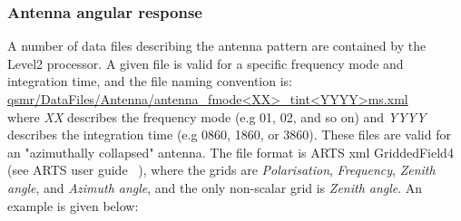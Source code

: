 \subsubsection*{Antenna angular response}

A number of data files describing the antenna pattern
are contained by the Level2 processor.
A given file is valid for a specific frequency mode and integration
time, and the file naming convention is:\\
\url{qsmr/DataFiles/Antenna/antenna_fmode<XX>_tint<YYYY>ms.xml}\\
where \emph{XX} describes the frequency mode (e.g 01, 02, and so on)
and \emph{YYYY} describes the integration time (e.g 0860, 1860, or 3860).
These files are valid for an "azimuthally collapsed"
antenna. The file format is ARTS xml GriddedField4 (see ARTS user guide ~\citep{artsug}),
where the grids are \emph{Polarisation}, \emph{Frequency}, \emph{Zenith angle},
and \emph{Azimuth angle}, and the only non-scalar grid is \emph{Zenith angle}.
An example is given below:

